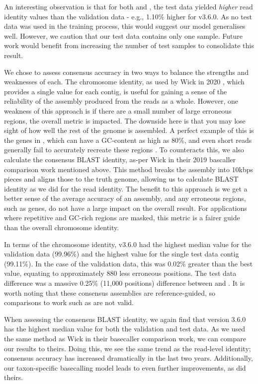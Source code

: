 An interesting observation is that for both \guppy{} and \tubby{}, the test data yielded \emph{higher} read identity values than the validation data - e.g., 1.10\% higher for \tubby{} v3.6.0. As no test data was used in the training process, this would suggest our model generalises well. However, we caution that our test data contains only one sample. Future work would benefit from increasing the number of test samples to consolidate this result.

\noindent
We chose to assess consensus accuracy in two ways to balance the strengths and weaknesses of each. The chromosome identity, as used by Wick \etal{} in 2020 \cite{wick2020}, which provides a single value for each contig, is useful for gaining a sense of the reliability of the assembly produced from the \ont{} reads as a whole. However, one weakness of this approach is if there are a small number of large erroneous regions, the overall metric is impacted. The downside here is that you may lose sight of how well the rest of the genome is assembled. A perfect example of this is the \ppe{} genes in \mtb{}, which can have a GC-content as high as 80\%, and even short reads generally fail to accurately recreate these regions \cite{Phelan2016}. To counteracts this, we also calculate the consensus BLAST identity, as-per Wick \etal{} in their 2019 bascaller comparison work mentioned above. This method breaks the assembly into 10kbps pieces and aligns those to the truth genome, allowing us to calculate BLAST identity as we did for the read identity. The benefit to this approach is we get a better sense of the average accuracy of an assembly, and any erroneous regions, such as \ppe{} genes, do not have a large impact on the overall result. For applications where repetitive and GC-rich regions are masked, this metric is a fairer guide than the overall chromosome identity.

In terms of the chromosome identity, \tubby{} v3.6.0 had the highest median value for the validation data (99.96\%) and the highest value for the single test data contig (99.11\%). In the case of the validation data, this was 0.02\% greater than the best \guppy{} value, equating to approximately 880 less erroneous positions. The test data difference was a massive 0.25\% (11,000 positions) difference between \tubby{} and \guppy{}. It is worth noting that these consensus assemblies are reference-guided, so comparisons to work such as \cite{wick2020} are not valid.

When assessing the consensus BLAST identity, we again find that \tubby{} version 3.6.0 has the highest median value for both the validation and test data. As we used the same method as Wick \etal{} in their basecaller comparison work, we can compare our results to theirs. Doing this, we see the same trend as the read-level identity; consensus accuracy has increased dramatically in the last two years. Additionally, our taxon-specific basecalling model leads to even further improvements, as did theirs. 

